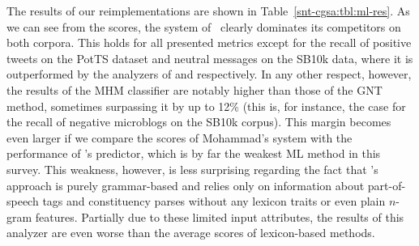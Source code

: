 The results of our reimplementations are shown in
Table~\ref{snt-cgsa:tbl:ml-res}.  As we can see from the scores, the
system of~\citet{Mohammad:13} clearly dominates its competitors on
both corpora. This holds for all presented metrics except for the
recall of positive tweets on the PotTS dataset and neutral messages on
the SB10k data, where it is outperformed by the analyzers of
\citet{Guenther:14} and \citet{Gamon:04} respectively.  In any other
respect, however, the results of the MHM classifier are notably higher
than those of the GNT method, sometimes surpassing it by up to 12\%
(this is, for instance, the case for the recall of negative microblogs
on the SB10k corpus).  This margin becomes even larger if we compare
the scores of Mohammad's system with the performance of
\citeauthor{Gamon:04}'s predictor, which is by far the weakest ML
method in this survey.  This weakness, however, is less surprising
regarding the fact that \citeauthor{Gamon:04}'s approach is purely
grammar-based and relies only on information about part-of-speech tags
and constituency parses without any lexicon traits or even plain
$n$-gram features.  Partially due to these limited input attributes,
the results of this analyzer are even worse than the average scores of
lexicon-based methods.




